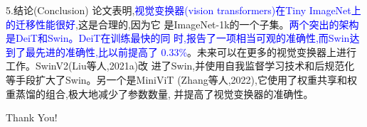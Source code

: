 \documentclass[UTF8]{ctexbeamer}
\begin{document}
\begin{frame}{5.结论(Conclusion)}
  \kaishu
  论文表明,\textcolor{blue}{视觉变换器(vision transformers)在Tiny ImageNet上的迁移性能很好},这是合理的,因为它
  是ImageNet-1k的一个子集。\textcolor{blue}{两个突出的架构是DeiT和Swin。DeiT在训练最快的同
  时,报告了一项相当可观的准确性,而Swin达到了最先进的准确性,比以前提高了
  0.33\%}。未来可以在更多的视觉变换器上进行工作。SwinV2(Liu等人,2021a)改
  进了Swin,并使用自我监督学习技术和后规范化等手段扩大了Swin。另一个是MiniViT
  (Zhang等人,2022),它使用了权重共享和权重蒸馏的组合,极大地减少了参数数量,
  并提高了视觉变换器的准确性。
\end{frame}

\begin{frame}
  \centering
  \Huge Thank You!
\end{frame}
\end{document}
